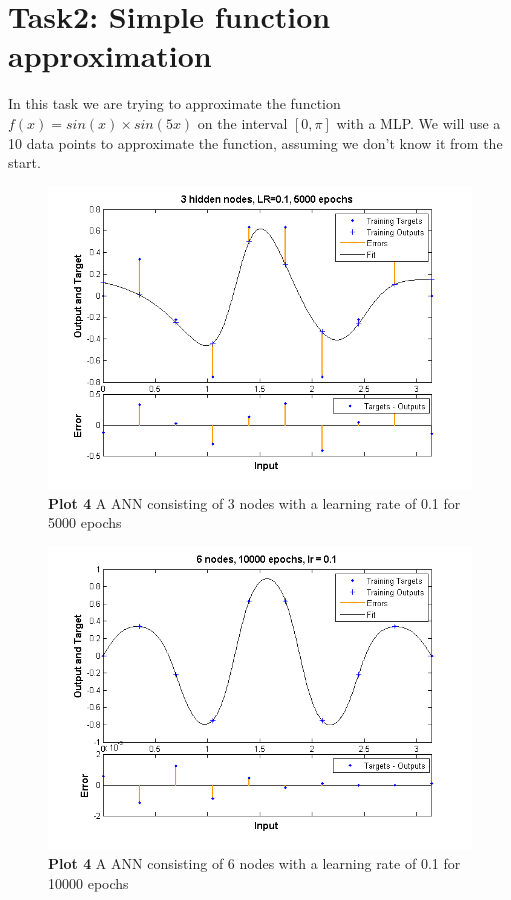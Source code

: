 \documentclass[a4paper]{article}
\begin{document}
\section{Task2: Simple function approximation}
In this task we are trying to approximate the function $f(x) = sin(x) \times sin(5x)$ on the interval $[0, \pi]$ with a MLP. We will use a 10 data points to approximate the function, assuming we don't know it from the start. 
\begin{figure}[h!] %
	\includegraphics[scale=0.8]{plot4_3nodes.png}
	\caption{\label{fig:plot4_3nodes.png}\textbf{Plot 4} A ANN consisting of 3 nodes with a learning rate of 0.1 for 5000 epochs}
\end{figure}
\begin{figure}[h!] %
	\includegraphics[scale=0.8]{plot4_6nodes.png}
	\caption{\label{fig:plot4_6nodes.png}\textbf{Plot 4} A ANN consisting of 6 nodes with a learning rate of 0.1 for 10000 epochs}
\end{figure}
\end{document}
